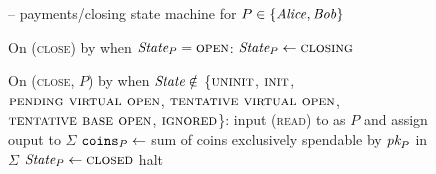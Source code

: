 \begin{figure}[H]
\begin{systembox}{\fchan{} -- payments/closing state machine for $P \in
  \{\mathit{Alice}, \mathit{Bob}\}$}
\begin{algorithmic}[1]
      \State On (\textsc{close}) by \environment when $\itistate_P =
      \textsc{open}$:
      \Indent
        \State $\itistate_P \gets \textsc{closing}$
      \EndIndent
      \Statex

      \State On (\textsc{close}, $P$) by \adversary when $\itistate \notin$
      \{$\textsc{uninit}$, $\textsc{init}$, $\textsc{pending virtual open}$,
      $\textsc{tentative virtual open}$, $\textsc{tentative base open}$,
      $\textsc{ignored}$\}:
      \label{code:functionality:pay-close:check}
      \Indent
        \State input (\textsc{read}) to \ledger as $P$ and assign ouput to
        $\Sigma$
        \State $\texttt{coins}_{P} \gets$ sum of coins exclusively spendable by
        $\textit{pk}_{P}$ in $\Sigma$
        \label{code:functionality:pay-close:coins}
          \State $\itistate_P \gets \textsc{closed}$
        \Else \: 
          \State halt
          \label{code:functionality:pay-close:halt}
        \EndIf
      \EndIndent
    \end{algorithmic}
  \end{systembox}
  \caption{}
  \label{code:functionality:pay-close}
\end{figure}

